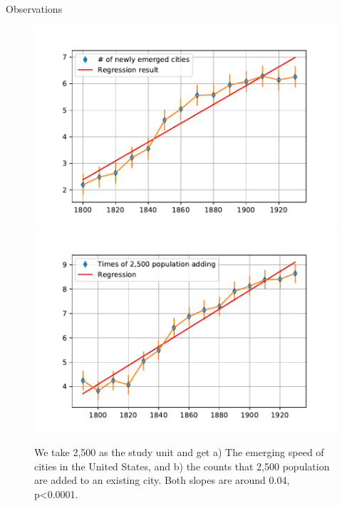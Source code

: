 \documentclass{beamer}
\begin{document}
\begin{frame}{Observations}
  \begin{figure}
    \includegraphics[width=0.48\linewidth]{pics/city_emerge.pdf}
    \includegraphics[width=0.48\linewidth]{pics/metapop_adding.pdf}
    \caption{We take 2,500 as the study unit and get a) The emerging speed of cities in the United States, and b) the counts that 2,500 population are added to an existing city. Both slopes are around 0.04, p<0.0001.}
  \end{figure}
\end{frame}
\end{document}
